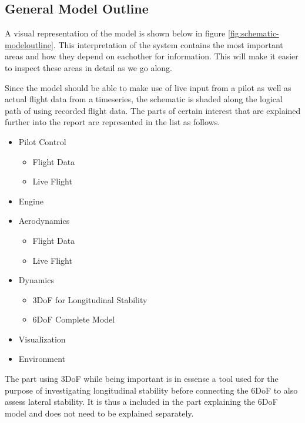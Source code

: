 \subsection{General Model Outline}

A visual representation of the model is shown below in figure \ref{fig:schematic-modeloutline}. This interpretation of the system contains the most important areas and how they depend on eachother for information. This will make it easier to inspect these areas in detail as we go along.


Since the model should be able to make use of live input from a pilot as well as actual flight data from a timeseries, the schematic is shaded along the logical path of using recorded flight data. The parts of certain interest that are explained further into the report are represented in the list as follows.

\begin{itemize}
  \item Pilot Control
    \begin{itemize}
      \item Flight Data
      \item Live Flight
    \end{itemize}
  \item Engine
  \item Aerodynamics
  \begin{itemize}
    \item Flight Data
    \item Live Flight
  \end{itemize}
  \item Dynamics
  \begin{itemize}
    \item 3DoF for Longitudinal Stability
    \item 6DoF Complete Model
  \end{itemize}
  \item Visualization
  \item Environment
\end{itemize}

The part using 3DoF while being important is in essense a tool used for the purpose of investigating longitudinal stability before connecting the 6DoF to also assess lateral stability. It is thus a included in the part explaining the 6DoF model and does not need to be explained separately.

